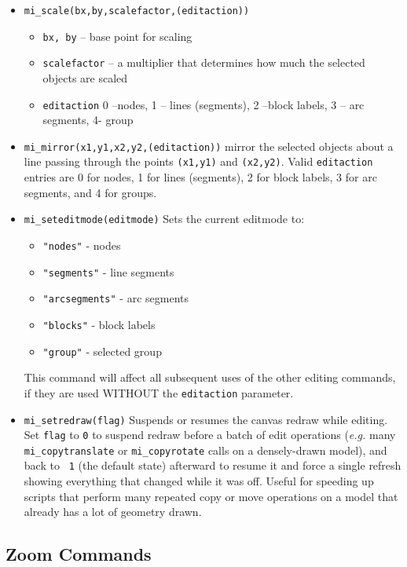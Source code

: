 \begin{itemize}
\item{\tt mi\_scale(bx,by,scalefactor,(editaction))}
        \begin{itemize}
        \item{\tt bx, by} -- base point for scaling
        \item{\tt scalefactor} -- a multiplier that determines how
        much the selected objects are scaled
        \item{\tt editaction}  0 --nodes, 1 -- lines (segments), 2 --block labels, 3 -- arc
                segments, 4- group
        \end{itemize}

\item{\tt mi\_mirror(x1,y1,x2,y2,(editaction))}
mirror the selected objects about a line passing through the points
{\tt (x1,y1)} and {\tt (x2,y2)}. Valid {\tt editaction} entries are
0 for nodes, 1 for lines (segments), 2 for block labels, 3 for arc
segments, and 4 for groups.

\item{\tt mi\_seteditmode(editmode)}
Sets the current editmode to:
        \begin{itemize}
        \item{\tt "nodes"} - nodes
        \item{\tt "segments"} - line segments
        \item{\tt "arcsegments"} - arc segments
        \item{\tt "blocks"} - block labels
        \item{\tt "group"} - selected group
        \end{itemize}
This command will affect all subsequent uses of the other editing
commands, if they are used WITHOUT the {\tt editaction} parameter.

\item{\tt mi\_setredraw(flag)} Suspends or resumes the canvas redraw
while editing. Set {\tt flag} to {\tt 0} to suspend redraw before a
batch of edit operations ({\em e.g.} many {\tt mi\_copytranslate} or
{\tt mi\_copyrotate} calls on a densely-drawn model), and back to {\tt
1} (the default state) afterward to resume it and force a single
refresh showing everything that changed while it was off. Useful for
speeding up scripts that perform many repeated copy or move operations
on a model that already has a lot of geometry drawn.
\end{itemize}

\subsection{Zoom Commands}

